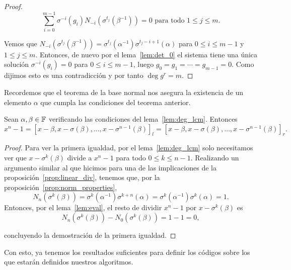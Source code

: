 \begin{proof}
\begin{equation}
\label{linear_system_2}
    \sum_{i=0}^{m-1} \sigma^{-i}(g_i)N_{-i}(\sigma^{t_j}(\beta^{-1})) = 0 \text{ para todo } 1 \leq j \leq m.
\end{equation}

Vemos que \(N_{-i}(\sigma^{t_j}(\beta^{-1})) = \sigma^{t_j}(\alpha^{-1})\sigma^{t_j - i + 1}(\alpha)\) para \(0 \leq i \leq m-1\) y \(1 \leq j \leq m\). Entonces, de nuevo por el lema~\ref{lem:det_0} el sistema tiene una única solución \(\sigma^{-i}(g_i) = 0\) para \(0 \leq i \leq m-1\), luego  \(g_0 = g_1 = \cdots = g_{m-1} = 0\). Como dijimos esto es una contradicción y por tanto \(\deg g^r = m\).
\end{proof}

Recordemos que el teorema de la base normal nos asegura la existencia de un elemento \(\alpha\) que cumpla las condiciones del teorema anterior.

\begin{corollary}
\label{cor:llcm_n}
    Sean \(\alpha, \beta \in \mathbb{F}\) verificando las condiciones del lema~\ref{lem:deg_lcm}. Entonces
\[
x^{n} - 1 = {[x - \beta, x - \sigma(\beta), \ldots, x - \sigma^{n-1}(\beta)]}_l = {[x - \beta, x - \sigma(\beta), \ldots, x - \sigma^{n-1}(\beta)]}_r
.\]
\end{corollary}
\begin{proof}
    Para ver la primera igualdad, por el lema~\ref{lem:deg_lcm} solo necesitamos ver que \(x - \sigma^{k}(\beta)\) divide a \(x^{n} -1\) para todo \(0 \le k \le n-1\). Realizando un argumento similar al que hicimos para una de las implicaciones de la proposición~\ref{prop:linear_div}, tenemos que, por la proposición~\ref{prop:norm_properties},
    \[
N_n(\sigma^{k}(\beta)) = \sigma^{k}(\alpha^{-1})\sigma^{k+n}(\alpha) = \sigma^{k}(\alpha^{-1})\sigma^{k}(\alpha) = 1
    .\]
Entonces, por el lema~\ref{lem:eval}, el resto de dividir \(x^{n} -1\) por \(x - \sigma^{k}(\beta)\) es
\[
N_n(\sigma^{k}(\beta)) - N_0(\sigma^{k}(\beta)) = 1 - 1 = 0
,\]

concluyendo la demostración de la primera igualdad.
\end{proof}

Con esto, ya tenemos los resultados suficientes para definir los códigos sobre los que estarán definidos nuestros algoritmos.

